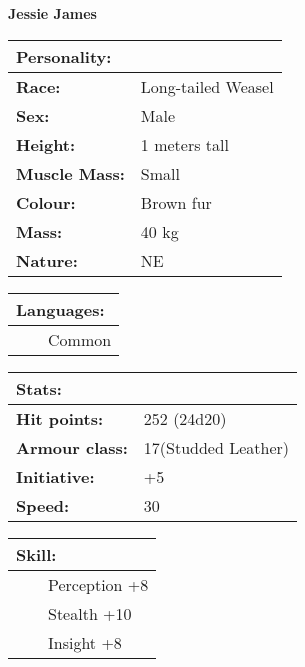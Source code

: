 \documentclass[11pt]{article}
\newcommand{\tabitem}{~~\llap{--}~~}
\begin{document}
	\begin{center}
\Huge \textbf{Jessie James}
	\end{center}
	\begin{multicols}{2}
\noindent \begin{tabularx}{\linewidth}{@{}l l}
\Large \textbf{Personality:} 	& 							\\
\hline
\textbf{Race:} 					& Long-tailed Weasel	 	\\
\textbf{Sex:} 					& Male 						\\
\textbf{Height:} 				& 1 meters tall			 	\\
\textbf{Muscle Mass:} 			& Small 					\\
\textbf{Colour:} 				& Brown fur				 	\\
\textbf{Mass:} 					& 40 kg						\\
\textbf{Nature:} 				& NE
		\end{tabularx}

\vspace{4mm}

\noindent \begin{tabularx}{\linewidth}{@{}l}
{\Large \textbf{Languages:}} \\
\hline
\tabitem Common \\
		\end{tabularx}

\vspace{4mm}

\noindent \begin{tabularx}{\linewidth}{@{}l l}
\Large \textbf{Stats:}		 	& 									\\
\hline
\textbf{Hit points:} 			& 252 (24d20)	 					\\
\textbf{Armour class:} 			& 17(Studded Leather)			 	\\
\textbf{Initiative:} 			& +5								\\
\textbf{Speed:} 				& 30		 						\\
		\end{tabularx}

\vspace{2mm}

\noindent \begin{tabularx}{\linewidth}{@{}l}
{\Large \textbf{Skill:}} \\
\hline
\tabitem Perception +8 \\
\tabitem Stealth +10 \\
\tabitem Insight +8
		\end{tabularx}


\end{multicols}
\end{document}
